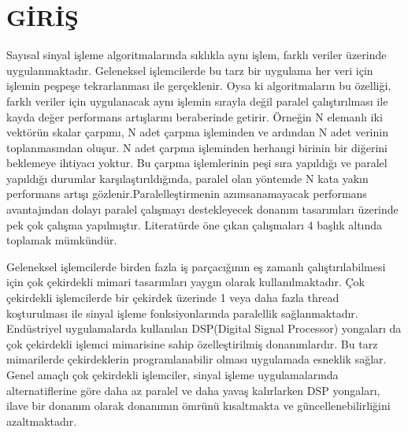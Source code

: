 \chapter{G\.{I}R\.{I}\c{S}} \label{chapter:giris}
Sayısal sinyal işleme algoritmalarında sıklıkla aynı işlem, farklı veriler üzerinde uygulanmaktadır. Geleneksel işlemcilerde bu tarz bir uygulama her veri için işlemin peşpeşe tekrarlanması ile gerçeklenir. Oysa ki algoritmaların bu özelliği, farklı veriler için uygulanacak aynı işlemin sırayla değil paralel çalıştırılması ile kayda değer performans artışlarını beraberinde getirir. Örneğin N elemanlı iki vektörün skalar çarpımı, N adet çarpma işleminden ve ardından N adet verinin toplanmasından oluşur. N adet çarpma işleminden herhangi birinin bir diğerini beklemeye ihtiyacı yoktur. Bu çarpma işlemlerinin peşi sıra yapıldığı ve paralel yapıldığı durumlar karşılaştırıldığında, paralel olan yöntemde N kata yakın performans artışı gözlenir.Paralelleştirmenin azımsanamayacak performans avantajından dolayı paralel çalışmayı destekleyecek donanım tasarımları üzerinde pek çok çalışma yapılmıştır. Literatürde öne çıkan çalışmaları 4 başlık altında toplamak mümkündür.  \par

Geleneksel işlemcilerde birden fazla iş parçacığının eş zamanlı çalıştırılabilmesi için çok çekirdekli mimari tasarımları yaygın olarak kullanılmaktadır. Çok çekirdekli işlemcilerde bir çekirdek üzerinde 1 veya daha fazla thread koşturulması ile sinyal işleme fonksiyonlarında paralellik sağlanmaktadır. Endüstriyel uygulamalarda kullanılan DSP(Digital Signal Processor) yongaları da çok çekirdekli işlemci mimarisine sahip özelleştirilmiş donanımlardır.\cite{dspArchitectures} Bu tarz mimarilerde çekirdeklerin programlanabilir olması uygulamada esneklik sağlar. Genel amaçlı çok çekirdekli işlemciler, sinyal işleme uygulamalarında alternatiflerine göre daha az paralel ve daha yavaş kalırlarken DSP yongaları, ilave bir donanım olarak donanımın ömrünü kısaltmakta ve güncellenebilirliğini azaltmaktadır.\cite{hallmans2013gpgpu} \par

